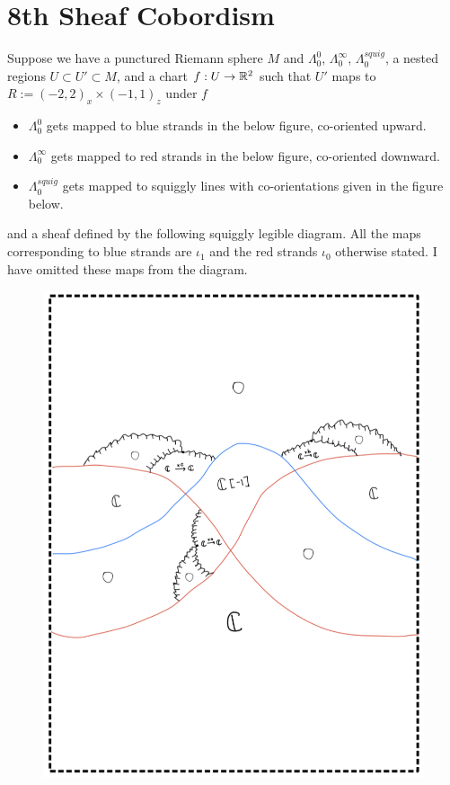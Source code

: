 \section{8th Sheaf Cobordism}
Suppose we have a punctured Riemann sphere $M$ and $\Lambda_0^0$, $\Lambda_0^\infty$, $\Lambda_0^{squig}$, a nested regions $U\subset U' \subset M$, and a chart $f : U \rightarrow \mathbb{R}^2$ such that $U'$ maps to $R:=(-2,2)_x \times (-1,1)_z$ under $f$
\begin{itemize}
\item $\Lambda_0^0$ gets mapped to blue strands in the below figure, co-oriented upward.

\item $\Lambda_0^\infty$ gets mapped to red strands in the below figure, co-oriented downward.

\item $\Lambda_0^{squig}$ gets mapped to squiggly lines with co-orientations given in the figure below.
\end{itemize}
and a sheaf defined by the following squiggly legible diagram. All the maps corresponding to blue strands are $\iota_1$ and the red strands $\iota_0$ otherwise stated. I have omitted these maps from the diagram.\\

\begin{figure}[H]
    \centering
    \includegraphics[scale = 0.85]{diagrams/cobord8/1.png}
    \caption{}
    \label{fig:your-label}
\end{figure}


